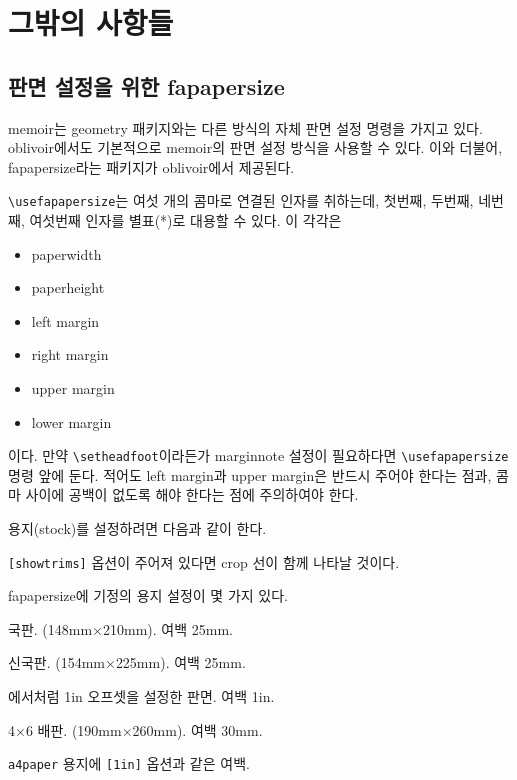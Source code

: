 \documentclass[
	12pt,
	a4paper,
	kosection,
	footnote,
	nobookmarks,
	microtype,
	figtabcapt,
]{oblivoir}
\def\cs#1{\texttt{\textbackslash #1}}
\begin{document}
\clearpage

\section{그밖의 사항들}

\subsection{판면 설정을 위한 fapapersize}

memoir는 geometry 패키지와는 다른 방식의 자체 판면 설정 명령을 가지고 있다.
oblivoir에서도 기본적으로 memoir의 판면 설정 방식을 사용할 수 있다.
이와 더불어, \textsf{fapapersize}라는 패키지가
oblivoir에서 제공된다.

\begin{boxedverbatim}
\usepackage{fapapersize}
\usefapapersize{*,*,1in,*,1in,*}
\end{boxedverbatim}

\cs{usefapapersize}는 여섯 개의 콤마로 연결된 인자를 취하는데, 첫번째, 두번째, 네번째, 여섯번째 인자를 별표(*)로 대용할 수 있다. 이 각각은 
\begin{itemize}\tightlist
\item paperwidth
\item paperheight
\item left margin
\item right margin
\item upper margin
\item lower margin
\end{itemize}
이다. 만약 \cs{setheadfoot}이라든가 marginnote 설정이 필요하다면 \cs{usefapapersize} 명령 앞에 둔다.
적어도 left margin과 upper margin은 반드시 주어야 한다는 점과, 콤마 사이에 공백이 없도록 해야 한다는 점에 주의하여야 한다.

용지(stock)를 설정하려면 다음과 같이 한다.
\begin{boxedverbatim}
\usepackage[stock]{fapapersize}
\usefastocksize{210mm,297mm}
\usefapapersize{190mm,260mm,1in,*,1in,*}
\end{boxedverbatim}
\texttt{[showtrims]} 옵션이 주어져 있다면 crop 선이 함께 나타날 것이다.

\textsf{fapapersize}에 기정의 용지 설정이 몇 가지 있다.
\begin{description} \tightlist
\item [mum] 국판. (148mm$\times$210mm). 여백 25mm.
\item [newmum] 신국판. (154mm$\times$225mm). 여백 25mm.
\item [1in] 에서처럼 1in 오프셋을 설정한 판면. 여백 1in.
\item [dbl4x6] 4$\times$6 배판. (190mm$\times$260mm). 여백 30mm.
\item [a4] \texttt{a4paper} 용지에 \texttt{[1in]} 옵션과 같은 여백.
\end{description}
\end{document}
